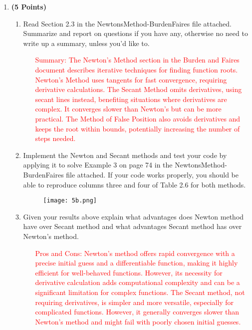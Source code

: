 \documentclass[11pt]{article}
\begin{document}
\begin{enumerate}
  \item {\bf (5 Points)}
\begin{enumerate}
\item Read Section 2.3 in the NewtonsMethod-BurdenFaires file
  attached. Summarize and report on questions if you have any,
  otherwise no need to write up a summary, unless you'd like to.
\begin{enumerate}
    \item[\textcolor{red}{Summary:}] 
    \textcolor{red}{
  The Newton's Method section in the Burden and Faires document describes iterative techniques for finding function roots. Newton's Method uses tangents for fast convergence, requiring derivative calculations. The Secant Method omits derivatives, using secant lines instead, benefiting situations where derivatives are complex. It converges slower than Newton's but can be more practical. The Method of False Position also avoids derivatives and keeps the root within bounds, potentially increasing the number of steps needed.}
\end{enumerate}



\item Implement the Newton and Secant methods and test your code by
  applying it to solve Example 3 on page 74 in the
  NewtonsMethod-BurdenFaires file attached. If your code works
  properly, you should be able to reproduce columns three and four of
  Table 2.6 for both methods.

    \begin{figure}[H]
    \centering
    \texttt{[image: 5b.png]} 
    \end{figure}



\item Given your results above explain what advantages does Newton
  method have over Secant method and what advantages Secant method has
  over Newton's method.



\begin{enumerate}
    \item[\textcolor{red}{Pros and Cons:}] 
    \textcolor{red}{Newton's method offers rapid convergence with a precise initial guess and a differentiable function, making it highly efficient for well-behaved functions. However, its necessity for derivative calculation adds computational complexity and can be a significant limitation for complex functions. The Secant method, not requiring derivatives, is simpler and more versatile, especially for complicated functions. However, it generally converges slower than Newton's method and might fail with poorly chosen initial guesses.}
\end{enumerate}



  
\end{enumerate}
\end{enumerate}
\end{document}
